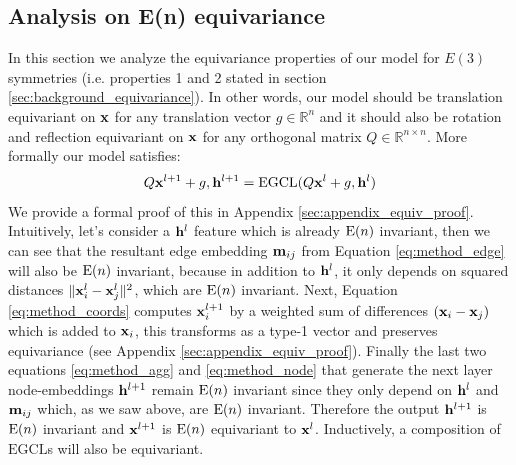 \subsection{Analysis on E(n) equivariance} \label{sec:equivariance_proof}
In this section we analyze the equivariance properties of our model for $E(3)$ symmetries (i.e. properties 1 and 2 stated in section \ref{sec:background_equivariance}). In other words, our model should be translation equivariant on $\mathbf{x}$ for any translation vector $g \in \mathbb{R}^n$ and it should also be rotation and reflection equivariant on $\mathbf{x}$ for any orthogonal matrix $Q \in \mathbb{R}^{n \times n}$. More formally our model satisfies:
%
\begin{equation*}
    Q\mathbf{x}^{l+1} + g, \mathbf{h}^{l+1}  = \mathrm{EGCL}(Q\mathbf{x}^l + g, \mathbf{h}^l)
\end{equation*}
%
We provide a formal proof of this in Appendix \ref{sec:appendix_equiv_proof}. Intuitively, let's consider a $\mathbf{h}^l$ feature which is already $\mathrm{E}(n)$ invariant, then we can see that the resultant edge embedding $\mathbf{m}_{ij}$ from Equation \ref{eq:method_edge} will also be $\mathrm{E}(n)$ invariant, because in addition to $\mathbf{h}^l$, it only depends on squared distances $\|\mathbf{x}_{i}^l-\mathbf{x}_{j}^l\|^{2}$, which are $\mathrm{E}(n)$ invariant. Next, Equation \ref{eq:method_coords} computes $\mathbf{x}^{l+1}_i$ by a weighted sum of differences $(\mathbf{x}_i - \mathbf{x}_j)$ which is added to $\mathbf{x}_i$, this transforms as a type-1 vector and preserves equivariance (see Appendix \ref{sec:appendix_equiv_proof}). Finally the last two equations \ref{eq:method_agg} and \ref{eq:method_node} that generate the next layer node-embeddings $\mathbf{h}^{l+1}$ remain $\mathrm{E}(n)$ invariant since they only depend on $\mathbf{h}^l$ and $\mathbf{m}_{ij}$ which, as we saw above, are $\mathrm{E}(n)$ invariant. Therefore the output $\mathbf{h}^{l+1}$ is $\mathrm{E}(n)$ invariant and $\mathbf{x}^{l+1}$ is $\mathrm{E}(n)$ equivariant to $\mathbf{x}^{l}$. Inductively, a composition of $\mathrm{EGCL}$s will also be equivariant.

